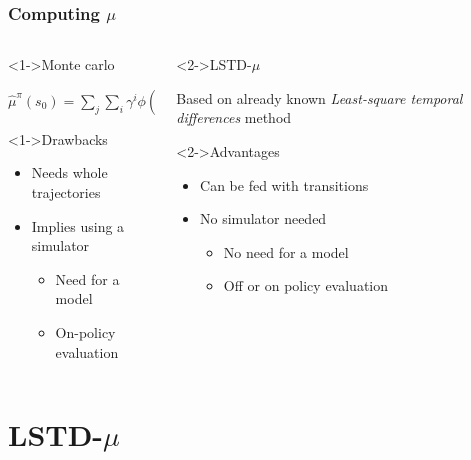 \documentclass{beamer}
\begin{document}
\begin{frame}
\frametitle{Computing $\mu$}
\label{sec-2_2_4}
\begin{columns}
\begin{column}{.4\textwidth}
\begin{block}<1->{Monte carlo}
\label{sec-2_2_4_1}

     $\hat\mu^\pi(s_0) = \sum\limits_j\sum\limits_i\gamma^i\phi(s^j_i)$
\end{block}
\begin{block}<1->{Drawbacks}
\label{sec-2_2_4_2}


\begin{itemize}
\item Needs whole trajectories
\item Implies using a simulator
\begin{itemize}
\item Need for a model
\item On-policy evaluation
\end{itemize}
\end{itemize}
\end{block}
\end{column}
\begin{column}{.4\textwidth}
\begin{block}<2->{LSTD-$\mu$}
\label{sec-2_2_4_3}

     Based on already known \emph{Least-square temporal differences} method
\end{block}
\begin{block}<2->{Advantages}
\label{sec-2_2_4_4}


\begin{itemize}
\item Can be fed with transitions
\item No simulator needed
\begin{itemize}
\item No need for a model
\item Off or on policy evaluation
\end{itemize}
\end{itemize}
\end{block}
\end{column}
\end{columns}
\end{frame}
\section{LSTD-$\mu$}
\label{sec-3}
\end{document}
